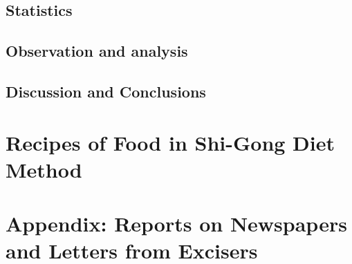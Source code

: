 \section{Statistics}
\section{Observation and analysis}
\section{Discussion and Conclusions}
\chapter{Recipes of Food in Shi-Gong Diet Method}
\chapter{Appendix: Reports on Newspapers and Letters from Excisers}

\bigskip\bigskip 



